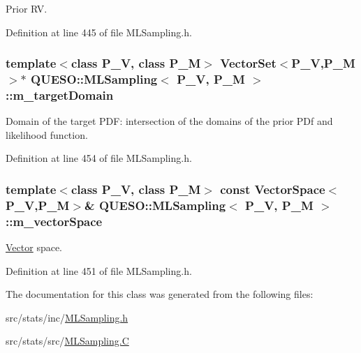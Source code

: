 Prior R\-V. 



Definition at line 445 of file M\-L\-Sampling.\-h.

\hypertarget{class_q_u_e_s_o_1_1_m_l_sampling_a21525858e93a7d9654fdf68c8ac25576}{
\subsubsection[{m\-\_\-target\-Domain}]{\setlength{\rightskip}{0pt plus 5cm}template$<$class P\-\_\-\-V, class P\-\_\-\-M$>$ {\bf Vector\-Set}$<$P\-\_\-\-V,P\-\_\-\-M$>$$\ast$ {\bf Q\-U\-E\-S\-O\-::\-M\-L\-Sampling}$<$ P\-\_\-\-V, P\-\_\-\-M $>$\-::m\-\_\-target\-Domain\hspace{0.3cm}{\ttfamily [private]}}}\label{class_q_u_e_s_o_1_1_m_l_sampling_a21525858e93a7d9654fdf68c8ac25576}


Domain of the target P\-D\-F\-: intersection of the domains of the prior P\-Df and likelihood function. 



Definition at line 454 of file M\-L\-Sampling.\-h.

\hypertarget{class_q_u_e_s_o_1_1_m_l_sampling_a7bc4c72f65ba9166ed94a6e198b0915b}{
\subsubsection[{m\-\_\-vector\-Space}]{\setlength{\rightskip}{0pt plus 5cm}template$<$class P\-\_\-\-V, class P\-\_\-\-M$>$ const {\bf Vector\-Space}$<$P\-\_\-\-V,P\-\_\-\-M$>$\& {\bf Q\-U\-E\-S\-O\-::\-M\-L\-Sampling}$<$ P\-\_\-\-V, P\-\_\-\-M $>$\-::m\-\_\-vector\-Space\hspace{0.3cm}{\ttfamily [private]}}}\label{class_q_u_e_s_o_1_1_m_l_sampling_a7bc4c72f65ba9166ed94a6e198b0915b}


\hyperlink{class_q_u_e_s_o_1_1_vector}{Vector} space. 



Definition at line 451 of file M\-L\-Sampling.\-h.



The documentation for this class was generated from the following files\-:\begin{DoxyCompactItemize}
\item 
src/stats/inc/\hyperlink{_m_l_sampling_8h}{M\-L\-Sampling.\-h}\item 
src/stats/src/\hyperlink{_m_l_sampling_8_c}{M\-L\-Sampling.\-C}\end{DoxyCompactItemize}
